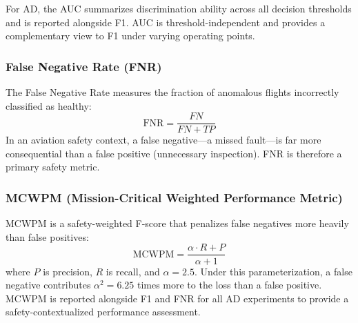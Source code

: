 For AD, the AUC summarizes discrimination ability across all decision thresholds
and is reported alongside F1. AUC is threshold-independent and provides a
complementary view to F1 under varying operating points.

\subsubsection{False Negative Rate (FNR)}

The False Negative Rate measures the fraction of anomalous flights incorrectly
classified as healthy:
\begin{equation}
    \text{FNR} = \frac{FN}{FN + TP}
\end{equation}
In an aviation safety context, a false negative---a missed fault---is far more
consequential than a false positive (unnecessary inspection). FNR is therefore
a primary safety metric.

\subsubsection{MCWPM (Mission-Critical Weighted Performance Metric)}

MCWPM is a safety-weighted F-score that penalizes false negatives more heavily
than false positives:
\begin{equation}
    \text{MCWPM} = \frac{\alpha \cdot R + P}{\alpha + 1}
    \label{eq:mcwpm}
\end{equation}
where $P$ is precision, $R$ is recall, and $\alpha = 2.5$. Under this
parameterization, a false negative contributes $\alpha^2 = 6.25$ times more
to the loss than a false positive. MCWPM is reported alongside F1 and FNR for
all AD experiments to provide a safety-contextualized performance assessment.
